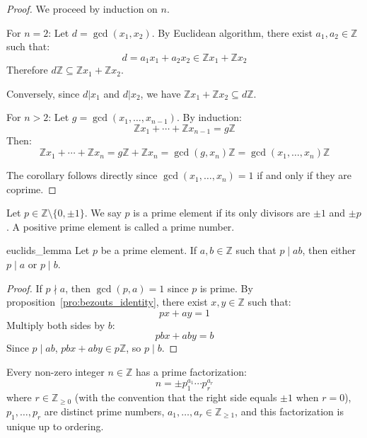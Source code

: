 \begin{proof}
  We proceed by induction on $n$.

  For $n=2$: Let $d = \gcd(x_1,x_2)$. By Euclidean algorithm, there exist $a_1,a_2 \in \mathbb{Z}$ such that:
  \[
    d = a_1x_1 + a_2x_2 \in \mathbb{Z}x_1 + \mathbb{Z}x_2
  \]
  Therefore $d\mathbb{Z} \subseteq \mathbb{Z}x_1 + \mathbb{Z}x_2$.

  Conversely, since $d|x_1$ and $d|x_2$, we have $\mathbb{Z}x_1 + \mathbb{Z}x_2 \subseteq d\mathbb{Z}$.

  For $n > 2$: Let $g = \gcd(x_1,\ldots,x_{n-1})$. By induction:
  \[
    \mathbb{Z}x_1 + \cdots + \mathbb{Z}x_{n-1} = g\mathbb{Z}
  \]
  Then:
  \[
    \mathbb{Z}x_1 + \cdots + \mathbb{Z}x_n = g\mathbb{Z} + \mathbb{Z}x_n = \gcd(g,x_n)\mathbb{Z} = \gcd(x_1,\ldots,x_n)\mathbb{Z}
  \]

  The corollary follows directly since $\gcd(x_1,\ldots,x_n) = 1$ if and only if they are coprime.
\end{proof}

\begin{definition}
  Let $p \in \mathbb{Z} \setminus \{0,\pm1\}$. We say $p$ is a prime element if its only divisors are $\pm1$ and $\pm p$.
  A positive prime element is called a prime number.
\end{definition}

\begin{proposition}{euclids_lemma}
  Let $p$ be a prime element. If $a,b \in \mathbb{Z}$ such that $p\mid ab$, then either $p\mid a$ or $p\mid b$.
\end{proposition}

\begin{proof}
  If $p \nmid a$, then $\gcd(p,a) = 1$ since $p$ is prime.
  By proposition~\ref{pro:bezouts_identity}, there exist $x,y \in \mathbb{Z}$ such that:
  \[
    px + ay = 1
  \]
  Multiply both sides by $b$:
  \[
    pbx + aby = b
  \]
  Since $p\mid ab$, $pbx+aby \in p\mathbb{Z}$, so $p\mid b$.
\end{proof}

\begin{theorem}
  Every non-zero integer $n \in \mathbb{Z}$ has a prime factorization:
  \[
    n = \pm p_1^{a_1}\cdots p_r^{a_r}
  \]
  where $r \in \mathbb{Z}_{\geq 0}$ (with the convention that the right side equals $\pm 1$ when $r=0$), $p_1,\ldots,p_r$ are distinct prime numbers, $a_1,\ldots,a_r \in \mathbb{Z}_{\geq 1}$, and this factorization is unique up to ordering.
\end{theorem}

